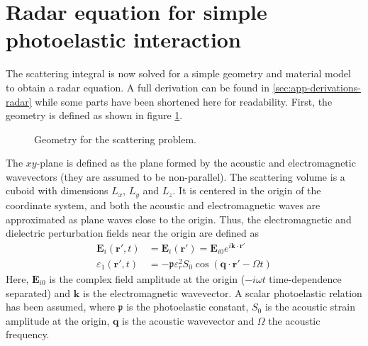 \documentclass[10pt,a4paper]{eitExjobb}
\begin{document}
	\section{Radar equation for simple photoelastic interaction \label{sec:analytical-radar}}
	The scattering integral is now solved for a simple geometry and material model to obtain a radar equation. A full derivation can be found in \ref{sec:app-derivations-radar} while some parts have been shortened here for readability. First, the geometry is defined as shown in figure \ref{fig:radareq-geom-main}.
	\begin{figure}[h]
		\centering
		
		\caption{\label{fig:radareq-geom-main} Geometry for the scattering problem.}
	\end{figure}
	The $xy$-plane is defined as the plane formed by the acoustic and electromagnetic wavevectors (they are assumed to be non-parallel). The scattering volume is a cuboid with dimensions $L_x$, $L_y$ and $L_z$. It is centered in the origin of the coordinate system, and both the acoustic and electromagnetic waves are approximated as plane waves close to the origin. Thus, the electromagnetic and dielectric perturbation fields near the origin are defined as
	\begin{align*}
	\bm{E}_i (\bm{r}',t) &= \bm{E}_i (\bm{r}') = \bm{E}_{i0} e^{i\bm{k}\cdot\bm{r}'} \\
	\varepsilon_1 (\bm{r}',t) &= -\mathfrak{p} \varepsilon_r^2 S_0 \cos(\bm{q} \cdot \bm{r}' - \Omega t)
	\end{align*}
	Here, $\bm{E}_{i0}$ is the complex field amplitude at the origin ($-i\omega t$ time-dependence separated) and $\bm{k}$ is the electromagnetic wavevector. A scalar photoelastic relation has been assumed, where $\mathfrak{p}$ is the photoelastic constant, $S_0$ is the acoustic strain amplitude at the origin, $\bm{q}$ is the acoustic wavevector and $\Omega$ the acoustic frequency.
	
\end{document}
